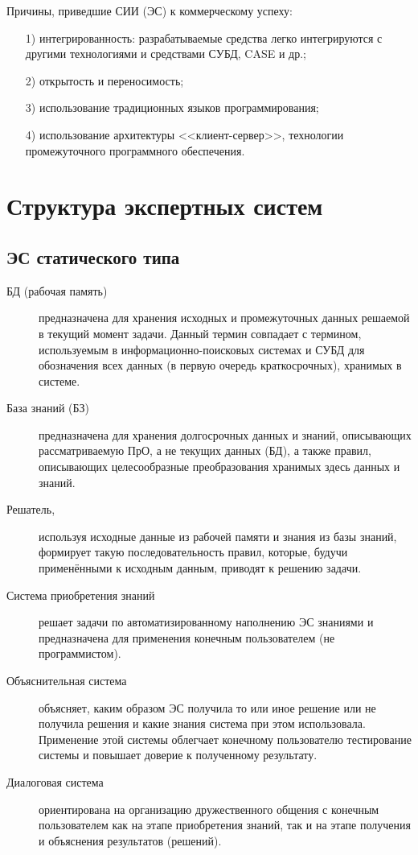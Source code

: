 Причины, приведшие СИИ (ЭС) к коммерческому успеху:
\begin{enumerate}
\item[1)] интегрированность: разрабатываемые средства легко
  интегрируются с другими технологиями и средствами СУБД, CASE и др.;
\item[2)] открытость и переносимость;
\item[3)] использование традиционных языков программирования;
\item[4)] использование архитектуры <<клиент-сервер>>, технологии
  промежуточного программного обеспечения.
\end{enumerate}


\section{Структура экспертных систем}

\subsection{ЭС статического типа}

\begin{description}
\item[БД (рабочая память)] предназначена для хранения исходных и
  промежуточных данных решаемой в текущий момент задачи. Данный термин
  совпадает с термином, используемым в информационно-поисковых
  системах и СУБД для обозначения всех данных (в первую очередь
  краткосрочных), хранимых в системе.
\item[База знаний (БЗ)] предназначена для хранения долгосрочных данных
  и знаний, описывающих рассматриваемую ПрО, а не текущих данных (БД),
  а также правил, описывающих целесообразные преобразования хранимых
  здесь данных и знаний.
\item[Решатель,] используя исходные данные из рабочей памяти и знания
  из базы знаний, формирует такую последовательность правил, которые,
  будучи применёнными к исходным данным, приводят к решению задачи.
\item[Система приобретения знаний] решает задачи по
  автоматизированному наполнению ЭС знаниями и предназначена для
  применения конечным пользователем (не программистом).
\item[Объяснительная система] объясняет, каким образом ЭС получила то
  или иное решение или не получила решения и какие знания система при
  этом использовала. Применение этой системы облегчает конечному
  пользователю тестирование системы и повышает доверие к полученному
  результату.
\item[Диалоговая система]  ориентирована на организацию дружественного
  общения с конечным пользователем как на этапе приобретения знаний,
  так и на этапе получения и объяснения результатов (решений).
\end{description}

